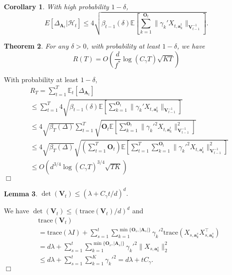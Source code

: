 \documentclass{article}
\newcommand{\bA}{\mathbf{A}}
\newcommand{\ba}{\mathbf{a}}
\newcommand{\bO}{\mathbf{O}}
\newcommand{\bV}{\mathbf{V}}
\newcommand{\cH}{\mathcal{H}}
\newcommand{\EE}{\mathbb{E}}
\newcommand{\trace}{\mathrm{trace}}
\newcommand{\abs}[1]{\left| #1 \right|}
\newcommand{\norm}[1]{\| #1 \|}
\newtheorem{theorem}{Theorem}[section]
\newtheorem{corollary}[theorem]{Corollary}%
\newtheorem{lemma}[theorem]{Lemma}%
\newenvironment{proof}{\noindent {\textbf{Proof. }}}{$\Box$ \medskip}
\begin{document}
\begin{corollary}
With high probability $1-\delta$, 
$$
E[\Delta_{\bA_t}|\cH_t] \leq 4\sqrt{\beta_{t-1}(\delta) \EE[\sum_{k=1}^{\bO_t}\norm{\gamma_k' X_{t,\ba_k^t}}_{\bV_{t-1}^{-1}}]}.
$$
\end{corollary}
	
\begin{theorem}
For any $\delta > 0$, with probability at least $1 - \delta$, we have
\begin{equation}
R(T) = O(\frac{d}{f^*}\log(C_\gamma T)\sqrt{KT})
\end{equation}
\end{theorem}
\begin{proof}
With probability at least $1-\delta$,
\begin{equation}
\begin{split}
&R_T =\sum_{t=1}^{T} \EE_{t}[\Delta_{\bA_t}] \\
&\leq \sum_{t=1}^{T} 4 \sqrt{\beta_{t-1}(\delta) \EE[\sum_{k=1}^{\bO_t}\norm{\gamma_k' X_{t,\ba_k^t}}_{\bV_{t-1}^{-1}}]}\\
&\leq 4\sqrt{\beta_T(\Delta)} \sum_{t=1}^{T} \sqrt{\bO_t \EE[\sum_{k=1}^{\bO_t}\norm{\gamma_k'^2 X_{t,\ba_k^t}}_{\bV_{t-1}^{-1}}^2]}\\
&\leq 4\sqrt{\beta_T(\Delta)} \sqrt{(\sum_{t=1}^{T} \bO_t) \EE[\sum_{t=1}^{T} \sum_{k=1}^{\bO_t}\norm{\gamma_k'^2 X_{t,\ba_k^t}}_{\bV_{t-1}^{-1}}^2]}  \\
&\leq O(d^{3/4}\log(C_\gamma T)^{3/4}\sqrt{TK})
\end{split}
\end{equation}
\end{proof}
	
\begin{lemma} %
$\det(\bV_t) \leq (\lambda + C_\gamma t/d)^d.$
\end{lemma}
\begin{proof}
We have $\det(\bV_t) \leq (\trace(\bV_t)/d)^d$ and
\begin{align*}
&\trace(\bV_t)\\
& = \trace(\lambda I) + \sum_{s=1}^t \sum_{k=1}^{\min\{\bO_s,\abs{\bA_s}\}} \gamma_k'^2 \trace(X_{s,\ba_k^s} X_{s,\ba_k^s}^{\top})\\	
& = d \lambda + \sum_{s=1}^t \sum_{k=1}^{\min\{\bO_s,\abs{\bA_s}\}} \gamma_k'^2 \norm{X_{s,\ba_k^s}}_2^2\\
& \leq d \lambda + \sum_{s=1}^t\sum_{k=1}^{K}\gamma_k'^2=d\lambda + tC_\gamma.
\end{align*}
\end{proof}
\end{document}
